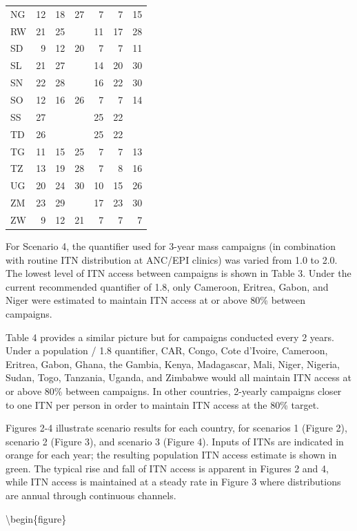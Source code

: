 \documentclass[review,
3p]{elsarticle} %
\begin{document}
\begin{longtable}{lrrrrrr}
NG & 12 & 18 & 27 & 7 & 7 & 15 \\ 
RW & 21 & 25 &  & 11 & 17 & 28 \\ 
SD & 9 & 12 & 20 & 7 & 7 & 11 \\ 
SL & 21 & 27 &  & 14 & 20 & 30 \\ 
SN & 22 & 28 &  & 16 & 22 & 30 \\ 
SO & 12 & 16 & 26 & 7 & 7 & 14 \\ 
SS & 27 &  &  & 25 & 22 &  \\ 
TD & 26 &  &  & 25 & 22 &  \\ 
TG & 11 & 15 & 25 & 7 & 7 & 13 \\ 
TZ & 13 & 19 & 28 & 7 & 8 & 16 \\ 
UG & 20 & 24 & 30 & 10 & 15 & 26 \\ 
ZM & 23 & 29 &  & 17 & 23 & 30 \\ 
ZW & 9 & 12 & 21 & 7 & 7 & 7 \\ 
\bottomrule
\end{longtable}

For Scenario 4, the quantifier used for 3-year mass campaigns (in
combination with routine ITN distribution at ANC/EPI clinics) was varied
from 1.0 to 2.0. The lowest level of ITN access between campaigns is
shown in Table 3. Under the current recommended quantifier of 1.8, only
Cameroon, Eritrea, Gabon, and Niger were estimated to maintain ITN
access at or above 80\% between campaigns.

Table 4 provides a similar picture but for campaigns conducted every 2
years. Under a population / 1.8 quantifier, CAR, Congo, Cote d'Ivoire,
Cameroon, Eritrea, Gabon, Ghana, the Gambia, Kenya, Madagascar, Mali,
Niger, Nigeria, Sudan, Togo, Tanzania, Uganda, and Zimbabwe would all
maintain ITN access at or above 80\% between campaigns. In other
countries, 2-yearly campaigns closer to one ITN per person in order to
maintain ITN access at the 80\% target.

Figures 2-4 illustrate scenario results for each country, for scenarios
1 (Figure 2), scenario 2 (Figure 3), and scenario 3 (Figure 4). Inputs
of ITNs are indicated in orange for each year; the resulting population
ITN access estimate is shown in green. The typical rise and fall of ITN
access is apparent in Figures 2 and 4, while ITN access is maintained at
a steady rate in Figure 3 where distributions are annual through
continuous channels.

\textbackslash begin\{figure\}
\end{document}
